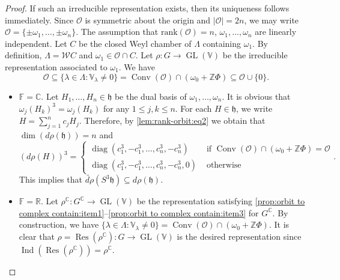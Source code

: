 \documentclass[11pt,reqno]{amsart}
\DeclareMathOperator{\GL}{GL}
\DeclareMathOperator{\Ind}{Ind}
\DeclareMathOperator{\Res}{Res}
\DeclareMathOperator{\diag}{diag}
\DeclareMathOperator{\Conv}{Conv}
\newcommand{\rank}{\mathrm{rank}} %
\newcommand{\W}{\mathcal{W}}
\begin{document}
\begin{proof}
If such an irreducible representation exists,  then its uniqueness follows immediately.  Since $\mathcal{O}$ is symmetric about the origin and $|\mathcal{O}| = 2n$,  we may write $\mathcal{O} = \{ \pm \omega_1,\dots,  \pm \omega_n \}$.  The assumption that $\rank (\mathcal{O}) = n$,  $\omega_1,\dots,  \omega_n$ are linearly independent.  Let $C$ be the closed Weyl chamber of $\Lambda$ containing $\omega_1$.  By definition,  $\Lambda = \W C$ and $\omega_1 \in \mathcal{O} \cap C$.  Let $\rho: G \to \GL(\mathbb{V})$ be the irreducible representation associated to $\omega_1$.  We have 
\[
\mathcal{O} \subseteq \{\lambda \in \Lambda: \mathbb{V}_{\lambda} \ne 0 \} = \Conv(\mathcal{O}) \cap (\omega_0 + \mathbb{Z} \Phi) \subseteq \mathcal{O} \cup \{ 0 \}.
\]
\begin{itemize}
\item[$\diamond$] $\mathbb{F} = \mathbb{C}$.  Let $H_1,\dots,  H_n \in \mathfrak{h}$ be the dual basis of $\omega_1,\dots,  \omega_n$.  It is obvious that $\omega_j (H_k)^3 = \omega_j (H_k)$ for any $1 \le j,  k \le n$.  For each $H \in \mathfrak{h}$,  we write $H = \sum_{j=1}^n c_j H_j$.  Therefore,  by \eqref{lem:rank-orbit:eq2} we obtain that $\dim \left( d \rho (\mathfrak{h}) \right) = n$ and 
\[
\left( d \rho (H) \right)^3 = 
\begin{cases}
\diag \left( 
c^3_1, - c^3_1,  \dots,  c^3_n, - c^3_n \right) &\text{~if~} \Conv(\mathcal{O}) \cap (\omega_0 + \mathbb{Z} \Phi) = \mathcal{O} \\
\diag \left(c^3_1, - c^3_1,  \dots,  c^3_n, - c^3_n, 0  \right) &\text{~otherwise}
\end{cases}.
\]
This implies that $\widetilde{d \rho} \left(  S^3\mathfrak{h}\right) \subseteq d\rho (\mathfrak{h})$.
\item[$\diamond$] $\mathbb{F} = \mathbb{R}$.  Let $\rho^{\mathbb{C}}: G^{\mathbb{C}} \to \GL(\mathbb{V})$ be the representation satisfying \eqref{prop:orbit to complex contain:item1}--\eqref{prop:orbit to complex contain:item3} for $G^{\mathbb{C}}$.  By construction,  we have $\{\lambda \in \Lambda: \mathbb{V}_{\lambda} \ne 0 \} = \Conv(\mathcal{O}) \cap (\omega_0 + \mathbb{Z} \Phi) $.  It is clear that $\rho = \Res(\rho^{\mathbb{C}}): G \to \GL(\mathbb{V})$ is the desired representation since $\Ind \left( \Res \left( \rho^{\mathbb{C}}\right) \right) = \rho^{\mathbb{C}}$.  \qedhere
\end{itemize}
\end{proof}
\end{document}
